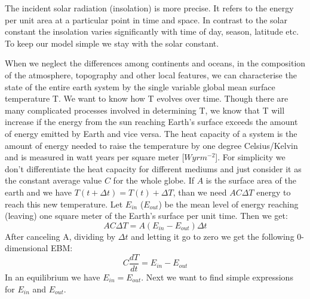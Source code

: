 \documentclass[%
thesis=student,%
coverpage=false,%
titlepage=false,%
headmarks=true, %
german,%
font=libertine, %
math=newpxtx, %
BCOR=5mm,%
coverBCOR=11mm%
]{tumbook}
\begin{document}
The incident solar radiation (insolation) is more precise. It refers to the energy per unit area at a particular point in time and space. In contrast to the solar constant the insolation varies significantly  with time of day, season, latitude etc. To keep our model simple we stay with the solar constant.

When we neglect the differences among continents and oceans, in the composition of the atmosphere, topography and other local features, we can characterise the state of the entire earth system by the single variable global mean surface temperature T. We want to know how T evolves over time. Though there are many complicated processes involved in determining T, we know that T will increase if the energy from the sun reaching Earth's surface exceeds the amount of energy emitted by Earth and vice versa.
The heat capacity of a system is the amount of energy needed to raise the temperature by one degree Celsius/Kelvin and is measured in watt years per square meter [$W yr m^{-2}$]. For simplicity we don't differentiate the heat capacity for different mediums and just consider it as the constant average value $C$ for the whole globe. If $A$ is the surface area of the earth and we have $T(t+\Delta t) = T(t) + \Delta T$, than we need $AC\Delta T$ energy to reach this new temperature.  Let $E_{in}$  ($E_{out}$) be the mean level of energy reaching (leaving) one square meter of the Earth's surface per unit time. Then we get: 
\begin{equation}
AC\Delta T = A(E_{in} - E_{out})\Delta t
\end{equation}
After canceling A, dividing by $\Delta t$ and letting it go to zero we get the following 0-dimensional EBM: 
\begin{equation}
    C\frac{dT}{dt} = E_{in} - E_{out}
\end{equation}
In an equilibrium we have $E_{in} = E_{out}$. Next we want to find simple expressions for $E_{in}$ and $E_{out}$.
\end{document}
